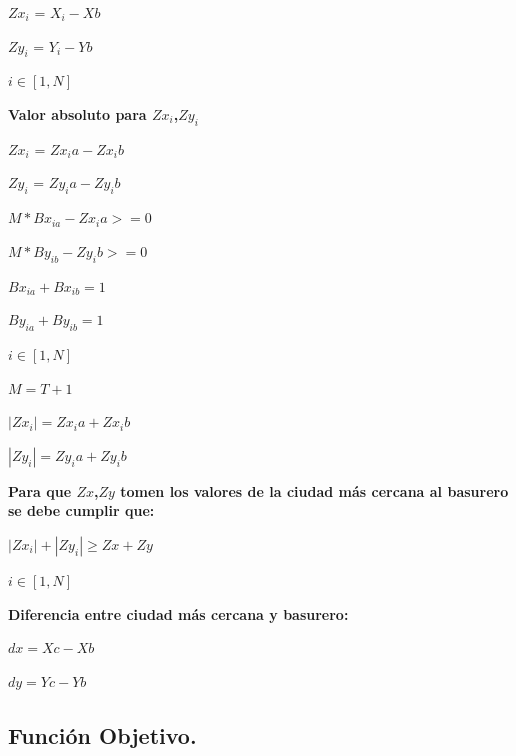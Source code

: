 \documentclass[10pt]{article}
\begin{document}
\begin{center}

 $Zx_i$ = $X_i- Xb $ 
 
  $Zy_i$ = $Y_i-Yb$ 
  
  $i \in [1,N]$
\end{center}

\textbf{Valor absoluto para  $Zx_i$,$Zy_i$ }\\

\begin{center}

 $Zx_i$ = $Zx_ia  - Zx_ib$ 
 
  $Zy_i$ = $Zy_ia  - Zy_ib$ \medskip 
  
  $M*Bx_{ia} - Zx_ia >= 0$
  
  $M*By_{ib} - Zy_ib >= 0$\medskip 
  
  $ Bx_{ia} + Bx_{ib} = 1 $
  
  $ By_{ia} + By_{ib} = 1 $\medskip 
  
   $i \in [1,N]$
   
   $M=T+1$\bigskip
  
   $ |Zx_i|=Zx_ia  + Zx_ib $ 
   
   $ |Zy_i|=Zy_ia  +  Zy_ib $ 
\end{center}


\textbf{Para que  $Zx$,$Zy$  tomen los valores de la ciudad más cercana al basurero se debe cumplir que: }\\

\begin{center}

 
  $ |Zx_i| + |Zy_i| \geq Zx + Zy $
  
   
   $i \in [1,N]$
  
  

\end{center}


\textbf{Diferencia entre ciudad  m\'as cercana y basurero: }\\

\begin{center}

 
  $ dx = Xc - Xb $
  
   
   $dy = Yc - Yb$
  
  

\end{center}


\subsection{Funci\'on Objetivo.}
\end{document}
